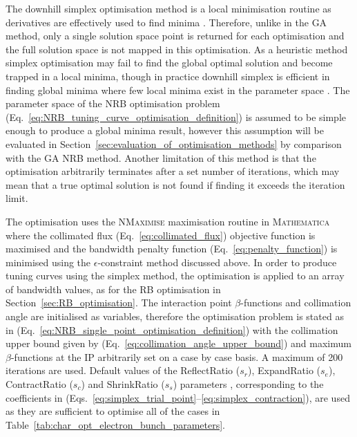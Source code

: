 \documentclass[../main.tex]{subfiles}
\begin{document}
The downhill simplex optimisation method is a local minimisation routine as derivatives are effectively used to find minima \cite{jones2016design}. Therefore, unlike in the GA method, only a single solution space point is returned for each optimisation and the full solution space is not mapped in this optimisation. As a heuristic method simplex optimisation may fail to find the global optimal solution and become trapped in a local minima, though in practice downhill simplex is efficient in finding global minima where few local minima exist in the parameter space \cite{wolfram2021nmaximize}. The parameter space of the NRB optimisation problem (Eq.~\ref{eq:NRB_tuning_curve_optimisation_definition}) is assumed to be simple enough to produce a global minima result, however this assumption will be evaluated in Section~\ref{sec:evaluation_of_optimisation_methods} by comparison with the GA NRB method. Another limitation of this method is that the optimisation arbitrarily terminates after a set number of iterations, which may mean that a true optimal solution is not found if finding it exceeds the iteration limit.

The optimisation uses the \textsc{NMaximise} maximisation routine in \textsc{Mathematica} \cite{wolfram2021nmaximize} where the collimated flux (Eq.~\ref{eq:collimated_flux}) objective function is maximised and the bandwidth penalty function (Eq.~\ref{eq:penalty_function}) is minimised using the $\epsilon$-constraint method discussed above. In order to produce tuning curves using the simplex method, the optimisation is applied to an array of bandwidth values, as for the RB optimisation in Section~\ref{sec:RB_optimisation}. The interaction point $\beta$-functions and collimation angle are initialised as variables, therefore the optimisation problem is stated as in (Eq.~\ref{eq:NRB_single_point_optimisation_definition}) with the collimation upper bound given by (Eq.~\ref{eq:collimation_angle_upper_bound}) and maximum $\beta$-functions at the IP arbitrarily set on a case by case basis. A maximum of 200 iterations are used. Default values of the ReflectRatio ($s_{r}$), ExpandRatio ($s_{e}$), ContractRatio ($s_{c}$) and ShrinkRatio ($s_{s}$) parameters \cite{wolfram2021nmaximize}, corresponding to the coefficients in (Eqs.~\ref{eq:simplex_trial_point}--\ref{eq:simplex_contraction}), are used as they are sufficient to optimise all of the cases in Table~\ref{tab:char_opt_electron_bunch_parameters}.
\end{document}
